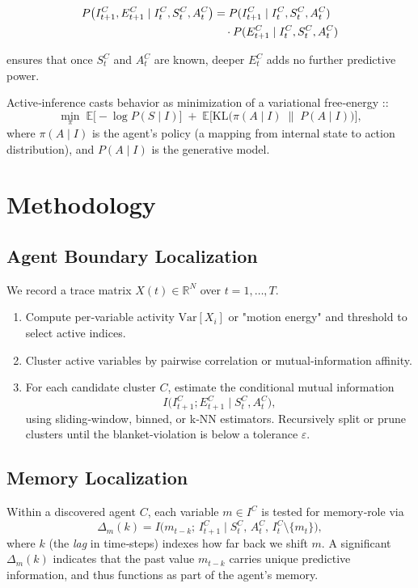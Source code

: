 \documentclass[10pt,conference]{IEEEtran}
\begin{document}
\begin{align}
P\bigl(I^C_{t+1},E^C_{t+1} \mid I^C_t, S^C_t, A^C_t\bigr)
&= P(I^C_{t+1} \mid I^C_t, S^C_t, A^C_t) \notag \\
&\quad \cdot P(E^C_{t+1} \mid I^C_t, S^C_t, A^C_t)
\end{align}

ensures that once $S^C_t$ and $A^C_t$ are known, deeper $E^C_t$ adds no further predictive power.  

Active‐inference casts behavior as minimization of a variational free‐energy \cite{Friston2010}::
\[
\min_{\pi}\;\mathbb{E}\bigl[-\log P(S\mid I)\bigr]
\;+\;\mathbb{E}\bigl[\mathrm{KL}\bigl(\pi(A\mid I)\;\|\;P(A\mid I)\bigr)\bigr],
\]
where $\pi(A\mid I)$ is the agent's policy (a mapping from internal state to action distribution), and $P(A\mid I)$ is the generative model.

\section{Methodology}

\subsection{Agent Boundary Localization}
We record a trace matrix $X(t)\in\mathbb{R}^N$ over $t=1,\dots,T$.
\begin{enumerate}
  \item Compute per‐variable activity $\mathrm{Var}[X_i]$ or "motion energy" and threshold to select active indices.
  \item Cluster active variables by pairwise correlation or mutual‐information affinity.
  \item For each candidate cluster $C$, estimate the conditional mutual information
  \[
  I\bigl(I^C_{t+1};E^C_{t+1}\mid S^C_t,A^C_t\bigr),
  \]
  using sliding‐window, binned, or k‐NN estimators.  Recursively split or prune clusters until the blanket‐violation is below a tolerance $\varepsilon$.
\end{enumerate}

\subsection{Memory Localization}
Within a discovered agent $C$, each variable $m\in I^C$ is tested for memory‐role via
\[
\Delta_m(k)
=
I\bigl(m_{t-k};\,I^C_{t+1}\mid S^C_t,\,A^C_t,\,I^C_t\setminus\{m_t\}\bigr),
\]
where $k$ (the \emph{lag} in time‐steps) indexes how far back we shift $m$.  A significant $\Delta_m(k)$ indicates that the past value $m_{t-k}$ carries unique predictive information, and thus functions as part of the agent's memory.  
\end{document}

